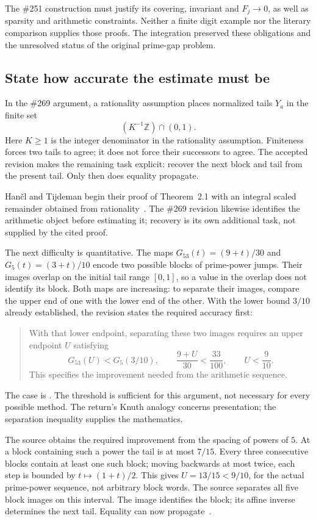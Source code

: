 The \#251 construction must justify its covering, invariant and $F_j\to0$,
as well as sparsity and arithmetic constraints. Neither a finite digit
example nor the literary comparison supplies those proofs. The integration
preserved these obligations and the unresolved status of the original
prime-gap problem.

\subsection{State how accurate the estimate must be}\label{sec:estimate}

In the \#269 argument, a rationality assumption places normalized tails
$Y_a$ in the finite set
\[
             (K^{-1}\mathbb Z)\cap(0,1).
\]
Here $K\ge1$ is the integer denominator in the rationality assumption.
Finiteness forces two tails to agree; it does not force their successors to
agree. The accepted revision makes the remaining task explicit: recover the
next block and tail from the present tail. Only then does equality propagate.

Han\v{c}l and Tijdeman begin their proof of Theorem~2.1 with an integral
scaled remainder obtained from rationality~\cite[p.~373]{hancl}. The \#269
revision likewise identifies the arithmetic object before estimating it;
recovery is its own additional task, not supplied by the cited proof.

The next difficulty is quantitative. The maps
$G_{53}(t)=(9+t)/30$ and $G_5(t)=(3+t)/10$ encode two possible blocks of
prime-power jumps. Their images overlap on the initial tail range $[0,1]$, so a value in the
overlap does not identify its block. Both maps are increasing: to separate
their images, compare the upper end of one with the lower end of the other.
With the lower bound $3/10$ already established, the revision states the
required accuracy first:
\begin{quote}
With that lower endpoint, separating these two images requires an upper
endpoint $U$ satisfying
\[
 G_{53}(U)<G_5(3/10),\qquad
 \frac{9+U}{30}<\frac{33}{100},\qquad U<\frac9{10}.
\]
This specifies the improvement needed from the arithmetic sequence.
\end{quote}
The case is . The threshold is sufficient for
this argument, not necessary for every possible method. The return's Knuth
analogy concerns presentation; the separation inequality supplies the mathematics.

The source obtains the required improvement from the spacing of powers of $5$.
At a block containing such a power the tail is at most $7/15$. Every three
consecutive blocks contain at least one such block; moving backwards at most
twice, each step is bounded by $t\mapsto(1+t)/2$. This gives $U=13/15<9/10$, for the actual
prime-power sequence, not arbitrary block words. The source separates all five
block images on this interval. The image identifies the block; its affine
inverse determines the next tail. Equality can now propagate~\cite[proof of the distinct-height theorem]{paper269}.

